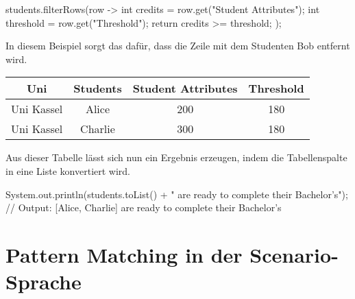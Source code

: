 \begin{jcodeblock}
    students.filterRows(row -> {
        int credits = row.get("Student Attributes");
        int threshold = row.get("Threshold");
        return credits >= threshold;
    });
\end{jcodeblock}

In diesem Beispiel sorgt das dafür, dass die Zeile mit dem Studenten Bob entfernt wird.

\begin{tabular}{|c|c|c|c|}
    \hline
    \textbf{Uni} & \textbf{Students} & \textbf{Student Attributes} & \textbf{Threshold} \\
    \hline
    Uni Kassel & Alice   & 200 & 180 \\
    Uni Kassel & Charlie & 300 & 180 \\
    \hline
\end{tabular}

Aus dieser Tabelle lässt sich nun ein Ergebnis erzeugen, indem die Tabellenspalte  in eine Liste konvertiert wird.

\begin{jcodeblock}
    System.out.println(students.toList() + " are ready to complete their Bachelor's");
    // Output: [Alice, Charlie] are ready to complete their Bachelor's
\end{jcodeblock}


\section{Pattern Matching in der Scenario-Sprache}\label{sec:scenario-pattern-matching}

